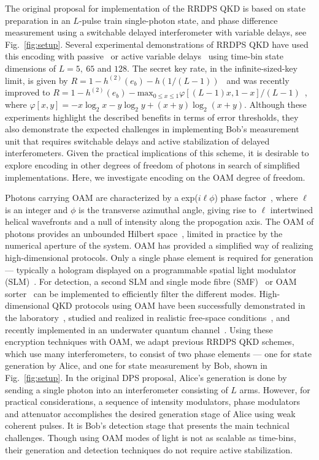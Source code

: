 \documentclass[twocolumn,aps,prl,floatfix,superscriptaddress]{revtex4-1}
\begin{document}
The original proposal for implementation of the RRDPS QKD is based on state preparation in an $L$-pulse train single-photon state, and phase difference measurement using a switchable delayed interferometer with variable delays, see Fig.~\ref{fig:setup}. Several experimental demonstrations of RRDPS QKD have used this encoding with passive~\cite{guan:15} or active variable delays~\cite{takesue:15,wang:15,li:16} using time-bin state dimensions of $L=5,~65$ and $128$. The secret key rate, in the infinite-sized-key limit, is given by \mbox{$R=1-h^{(2)}(e_b)-h(1/(L-1))$}~\cite{sasaki:14} and was recently improved to \mbox{$R=1-h^{(2)}(e_b)-\mathrm{max}_{0\leq x \leq 1}  \varphi [ (L-1)x,1-x]/(L-1)$}~\cite{Yin:18}, where \mbox{$\varphi[x,y]=-x \log_2 x -y \log_2 y +(x+y) \log_2 (x+y)$}. Although these experiments highlight the described benefits in terms of error thresholds, they also demonstrate the expected challenges in implementing Bob's measurement unit that requires switchable delays and active stabilization of delayed interferometers. Given the practical implications of this scheme, it is desirable to explore encoding in other degrees of freedom of photons in search of simplified implementations. Here, we investigate encoding on the OAM degree of freedom.

Photons carrying OAM are characterized by a exp($i\ell\phi$) phase factor~\cite{allen:92}, where $\ell$ is an integer and $\phi$ is the transverse azimuthal angle, giving rise to $\ell$ intertwined helical wavefronts and a null of intensity along the propogation axis. The OAM of photons provides an unbounded Hilbert space~\cite{erhard:17}, limited in practice by the numerical aperture of the system. OAM has provided a simplified way of realizing high-dimensional protocols. Only a single phase element is required for generation --- typically a hologram displayed on a programmable spatial light modulator (SLM)~\cite{heckenberg:92,forbes:16}. For detection, a second SLM and single mode fibre (SMF)~\cite{mair:01,qassim:14} or OAM sorter~\cite{berkhout:10,larocque:17} can be implemented to efficiently filter the different modes. High-dimensional QKD protocols using OAM have been successfully demonstrated in the laboratory~\cite{mafu:13,mirhosseini:15}, studied and realized in realistic free-space conditions~\cite{vallone:14,krenn:15,sit:17}, and recently implemented in an underwater quantum channel~\cite{bouchard:18}. Using these encryption techniques with OAM, we adapt previous RRDPS QKD schemes, which use many interferometers, to consist of two phase elements --- one for state generation by Alice, and one for state measurement by Bob, shown in Fig.~\ref{fig:setup}. In the original DPS proposal, Alice's generation is done by sending a single photon into an interferometer consisting of $L$ arms. However, for practical considerations, a sequence of intensity modulators, phase modulators and attenuator accomplishes the desired generation stage of Alice using weak coherent pulses. It is Bob's detection stage that presents the main technical challenges. Though using OAM modes of light is not as scalable as time-bins, their generation and detection techniques do not require active stabilization. 
\end{document}
